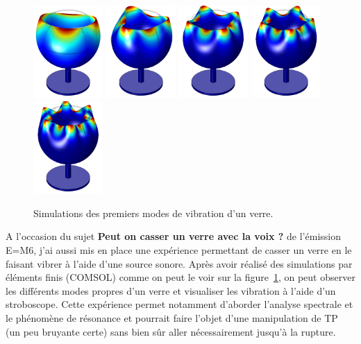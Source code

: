 \documentclass[12pt,a4paper]{article}
\begin{document}
\begin{figure}
\center
\includegraphics[height=100pt]{figures/wine_glass_f0.png}
\includegraphics[height=100pt]{figures/wine_glass_f1.png}
\includegraphics[height=100pt]{figures/wine_glass_f2.png}
\includegraphics[height=100pt]{figures/wine_glass_f3.png}
\includegraphics[height=100pt]{figures/wine_glass_f4.png}
\caption{Simulations des premiers modes de vibration d'un verre.}
\label{fig:wine_glass}
\end{figure}

A l'occasion du sujet \textbf{Peut on casser un verre avec la voix ?} de l'émission E=M6, j'ai aussi mis en place une expérience permettant de casser un verre en le faisant vibrer à l'aide d'une source sonore.
Après avoir réalisé des simulations par éléments finis (COMSOL) comme on peut le voir sur la figure~\ref{fig:wine_glass}, on peut observer les différents modes propres d'un verre et visualiser les vibration à l'aide d'un stroboscope.
Cette expérience permet notamment d'aborder l'analyse spectrale et le phénomène de résonance et pourrait faire l'objet d'une manipulation de TP (un peu bruyante certe) sans bien sûr aller nécessairement jusqu'à la rupture.
\end{document}
